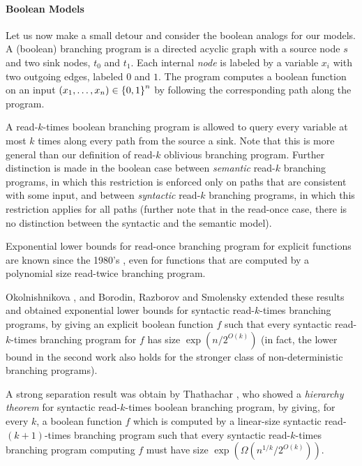 \documentclass[11pt]{article}
\begin{document}
\paragraph{Boolean Models}

Let us now make a small detour and consider the boolean analogs for our models. A (boolean) branching program is a directed acyclic graph with a source node $s$ and two sink nodes, $t_0$ and $t_1$. Each internal {\em node} is labeled by a variable $x_i$ with two outgoing edges, labeled $0$ and $1$. The program computes a boolean function on an input $(x_1, \ldots, x_n) \in \left\{ 0,1 \right\}^n$ by following the corresponding path along the program. 

A read-$k$-times boolean branching program is allowed to query every variable at most $k$ times along every path from the source a sink. Note that this is more general than our definition of read-$k$ oblivious branching program. Further distinction is made in the boolean case between {\em semantic} read-$k$ branching programs, in which this restriction is enforced only on paths that are consistent with some input, and between {\em syntactic} read-$k$ branching programs, in which this restriction applies for all paths (further note that in the read-once case, there is no distinction between the syntactic and the semantic model).

Exponential lower bounds for read-once branching program for explicit functions are known since the 1980's \cite{Zak84, BHST87, Wegener88}, even for functions that are computed by a polynomial size read-twice branching program.

Okolnishnikova \cite{Oko91}, and Borodin, Razborov and Smolensky \cite{BRS93} extended these results and obtained exponential lower bounds for syntactic read-$k$-times branching programs, by giving an explicit boolean function $f$ such that every syntactic read-$k$-times branching program for $f$ has size $\exp(n/2^{O(k)})$ (in fact, the lower bound in the second work also holds for the stronger class of non-deterministic branching programs).

A strong separation result was obtain by Thathachar \cite{Thathachar98}, who showed a {\em hierarchy theorem} for syntactic read-$k$-times boolean branching program, by giving, for every $k$, a boolean function $f$ which is computed by a linear-size syntactic read-$(k+1)$-times branching program such that every syntactic read-$k$-times branching program computing $f$ must have size $\exp(\Omega(n^{1/k}/2^{O(k)}))$.
\end{document}
